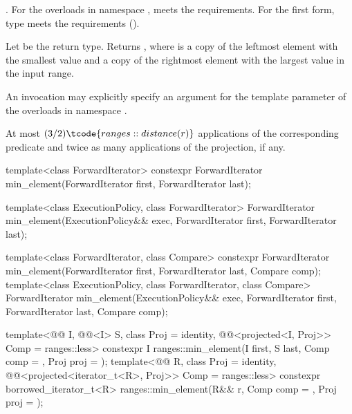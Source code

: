 \begin{itemdescr}
\pnum
\expects
{}.
For the overloads in namespace ,
 meets the  requirements.
For the first form, type  meets the 
requirements ().

\pnum
\returns
Let  be the return type.
Returns ,
where  is a copy of the leftmost element with the smallest value and
 a copy of the rightmost element with the largest value
in the input range.

\pnum
\remarks
An invocation may explicitly specify
an argument for the template parameter 
of the overloads in namespace .

\pnum
\complexity
At most $(3/2)\tcode{ranges::distance(r)}$ applications
of the corresponding predicate
and twice as many applications of the projection, if any.
\end{itemdescr}

%
\begin{itemdecl}
template<class ForwardIterator>
  constexpr ForwardIterator min_element(ForwardIterator first, ForwardIterator last);

template<class ExecutionPolicy, class ForwardIterator>
  ForwardIterator min_element(ExecutionPolicy&& exec,
                              ForwardIterator first, ForwardIterator last);

template<class ForwardIterator, class Compare>
  constexpr ForwardIterator min_element(ForwardIterator first, ForwardIterator last,
                                        Compare comp);
template<class ExecutionPolicy, class ForwardIterator, class Compare>
  ForwardIterator min_element(ExecutionPolicy&& exec,
                              ForwardIterator first, ForwardIterator last,
                              Compare comp);

template<@@ I, @@<I> S, class Proj = identity,
         @@<projected<I, Proj>> Comp = ranges::less>
  constexpr I ranges::min_element(I first, S last, Comp comp = {}, Proj proj = {});
template<@@ R, class Proj = identity,
         @@<projected<iterator_t<R>, Proj>> Comp = ranges::less>
  constexpr borrowed_iterator_t<R>
    ranges::min_element(R&& r, Comp comp = {}, Proj proj = {});
\end{itemdecl}

